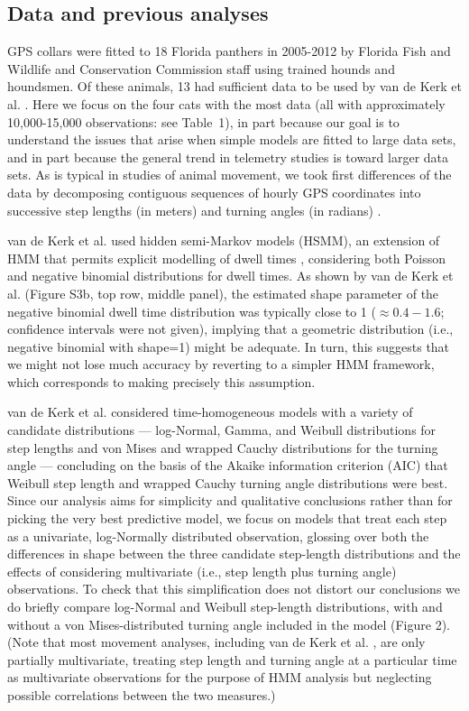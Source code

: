 \documentclass{bmcart}
\begin{document}
\subsection*{Data and previous analyses}


GPS collars were fitted to 18 Florida panthers in 2005-2012 by Florida
Fish and Wildlife and Conservation Commission staff using
trained hounds and houndsmen. Of these animals, 13 had 
sufficient data to be used by van de Kerk et al. \cite{kerk2015hidden}.
Here we focus on the four cats with the most data (all with approximately 10,000-15,000
observations: see Table~1), 
in part because our goal is to understand
the issues that arise when simple models are fitted to large data sets, and 
in part because the general trend in telemetry studies is toward larger data sets.  
As is typical in studies of animal movement, 
we took first differences of the data by decomposing
contiguous sequences of hourly GPS coordinates into 
successive step lengths (in meters) and turning angles (in radians)
\cite{turchin1998quantitative,kerk2015hidden}.


van de Kerk et al. \cite{kerk2015hidden} used hidden semi-Markov models (HSMM), 
an extension of HMM that permits explicit modelling of dwell times 
\cite{langrock_flexible_2012}, considering both Poisson and
negative binomial distributions for dwell times.  As shown 
by van de Kerk et al. \cite{kerk2015hidden} (Figure S3b, top row, middle panel),
the estimated shape parameter of the negative binomial dwell time
distribution was typically close to 1 ($\approx 0.4-1.6$; confidence
intervals were not given), implying that a geometric distribution
(i.e., negative binomial with shape=1) might be adequate. In turn,
this suggests that we might not lose much accuracy by reverting to 
a simpler HMM framework, which corresponds
to making precisely this assumption.


van de Kerk et al. \cite{kerk2015hidden} considered time-homogeneous models with 
a variety of candidate distributions %
--- log-Normal, Gamma, and Weibull distributions for step lengths
and von Mises and wrapped Cauchy distributions for the turning angle --- %
concluding on the basis of the Akaike information criterion (AIC) 
that Weibull step length and wrapped Cauchy turning angle distributions
were best.  
Since our analysis aims for simplicity and qualitative
conclusions rather than for picking the very best
predictive model, we focus on models that treat each step as
a univariate, log-Normally distributed observation, glossing
over both the differences in shape between
the three candidate step-length distributions and the effects
of considering multivariate (i.e., step length plus turning angle)
observations.  To check that this simplification
does not distort our conclusions
we do briefly compare log-Normal and Weibull
step-length distributions, with and without 
a von Mises-distributed turning angle included in the model (Figure 2).
(Note that most movement analyses, including van de Kerk et al.
\cite{kerk2015hidden}, are only partially multivariate, 
treating step length and turning angle at a particular time
as multivariate observations for the purpose of HMM
analysis but neglecting possible correlations
between the two measures.) 
\end{document}
